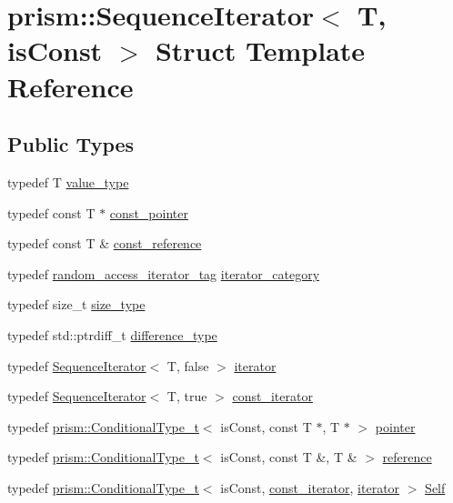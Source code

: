 \hypertarget{structprism_1_1_sequence_iterator}{}\section{prism\+:\+:Sequence\+Iterator$<$ T, is\+Const $>$ Struct Template Reference}
\label{structprism_1_1_sequence_iterator}
\subsection*{Public Types}
\begin{DoxyCompactItemize}
\item 
typedef T \hyperlink{structprism_1_1_sequence_iterator_a3b926a44e4184aecd9ab649cadab392d}{value\+\_\+type}
\item 
typedef const T $\ast$ \hyperlink{structprism_1_1_sequence_iterator_a4c3367cd1e3aacc1cd902bab256ee6b2}{const\+\_\+pointer}
\item 
typedef const T \& \hyperlink{structprism_1_1_sequence_iterator_a7739d968cd075878171e063d7a60d2e2}{const\+\_\+reference}
\item 
typedef \hyperlink{structprism_1_1random__access__iterator__tag}{random\+\_\+access\+\_\+iterator\+\_\+tag} \hyperlink{structprism_1_1_sequence_iterator_a8525d9ddbb07664ddab39df5d6d72b03}{iterator\+\_\+category}
\item 
typedef size\+\_\+t \hyperlink{structprism_1_1_sequence_iterator_a5a9c57ebdda1cd8eb2e4b3ddbd627fcf}{size\+\_\+type}
\item 
typedef std\+::ptrdiff\+\_\+t \hyperlink{structprism_1_1_sequence_iterator_a256c83c7b6da801b16778f39697e8db3}{difference\+\_\+type}
\item 
typedef \hyperlink{structprism_1_1_sequence_iterator}{Sequence\+Iterator}$<$ T, false $>$ \hyperlink{structprism_1_1_sequence_iterator_ac791d493ea5fafcc435a83dbe2385a1e}{iterator}
\item 
typedef \hyperlink{structprism_1_1_sequence_iterator}{Sequence\+Iterator}$<$ T, true $>$ \hyperlink{structprism_1_1_sequence_iterator_a8be80243dfbbc36132e108a7858eafd0}{const\+\_\+iterator}
\item 
typedef \hyperlink{type__traits_8h_ac3a08b98dd60c2b8253333ee25753cb4}{prism\+::\+Conditional\+Type\+\_\+t}$<$ is\+Const, const T $\ast$, T $\ast$ $>$ \hyperlink{structprism_1_1_sequence_iterator_a024492122445836e94097e10b02b700a}{pointer}
\item 
typedef \hyperlink{type__traits_8h_ac3a08b98dd60c2b8253333ee25753cb4}{prism\+::\+Conditional\+Type\+\_\+t}$<$ is\+Const, const T \&, T \& $>$ \hyperlink{structprism_1_1_sequence_iterator_a4039950f81c7604c1dba682faddf5652}{reference}
\item 
typedef \hyperlink{type__traits_8h_ac3a08b98dd60c2b8253333ee25753cb4}{prism\+::\+Conditional\+Type\+\_\+t}$<$ is\+Const, \hyperlink{structprism_1_1_sequence_iterator_a8be80243dfbbc36132e108a7858eafd0}{const\+\_\+iterator}, \hyperlink{structprism_1_1_sequence_iterator_ac791d493ea5fafcc435a83dbe2385a1e}{iterator} $>$ \hyperlink{structprism_1_1_sequence_iterator_a795689f7bf3a16b6c40cfc81879467b2}{Self}
\end{DoxyCompactItemize}

